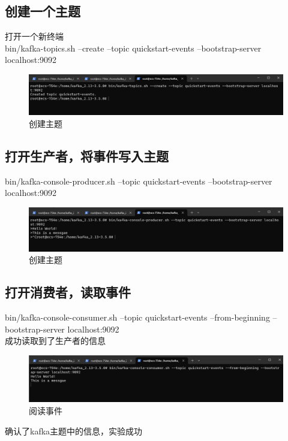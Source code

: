 \subsection{创建一个主题}
打开一个新终端\\
bin/kafka-topics.sh --create --topic quickstart-events --bootstrap-server localhost:9092
\begin{figure}[H]
  \centering
  \includegraphics[width=\textwidth]{figure/6.png}
  \caption{创建主题}
  \label{fig:my_label}
\end{figure}

\subsection{打开生产者，将事件写入主题}
bin/kafka-console-producer.sh --topic quickstart-events --bootstrap-server localhost:9092
\begin{figure}[H]
  \centering
  \includegraphics[width=\textwidth]{figure/7.png}
  \caption{创建主题}
  \label{fig:my_label}
\end{figure}

\subsection{打开消费者，读取事件}
bin/kafka-console-consumer.sh --topic quickstart-events --from-beginning --bootstrap-server localhost:9092\\
成功读取到了生产者的信息
\begin{figure}[H]
  \centering
  \includegraphics[width=\textwidth]{figure/8.png}
  \caption{阅读事件}
  \label{fig:my_label}
\end{figure}
确认了kafka主题中的信息，实验成功

